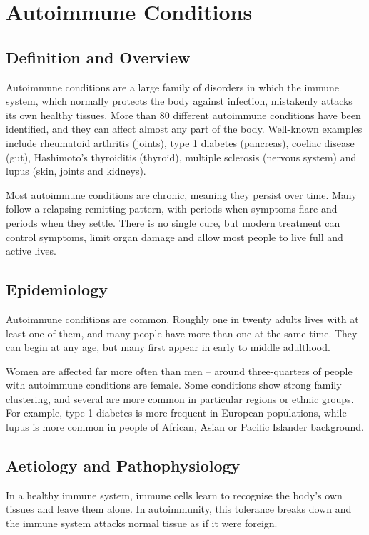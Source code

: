 \chapter{Autoimmune Conditions}

\section*{Definition and Overview}
Autoimmune conditions are a large family of disorders in which the immune system, which normally protects the body against infection, mistakenly attacks its own healthy tissues. More than 80 different autoimmune conditions have been identified, and they can affect almost any part of the body. Well-known examples include rheumatoid arthritis (joints), type 1 diabetes (pancreas), coeliac disease (gut), Hashimoto's thyroiditis (thyroid), multiple sclerosis (nervous system) and lupus (skin, joints and kidneys).

Most autoimmune conditions are chronic, meaning they persist over time. Many follow a relapsing-remitting pattern, with periods when symptoms flare and periods when they settle. There is no single cure, but modern treatment can control symptoms, limit organ damage and allow most people to live full and active lives.

\section*{Epidemiology}
Autoimmune conditions are common. Roughly one in twenty adults lives with at least one of them, and many people have more than one at the same time. They can begin at any age, but many first appear in early to middle adulthood.

Women are affected far more often than men -- around three-quarters of people with autoimmune conditions are female. Some conditions show strong family clustering, and several are more common in particular regions or ethnic groups. For example, type 1 diabetes is more frequent in European populations, while lupus is more common in people of African, Asian or Pacific Islander background.

\section*{Aetiology and Pathophysiology}
In a healthy immune system, immune cells learn to recognise the body's own tissues and leave them alone. In autoimmunity, this tolerance breaks down and the immune system attacks normal tissue as if it were foreign.

